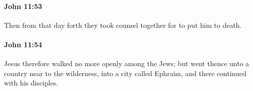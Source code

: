 		\paragraph{John 11:53} %
			\label{JOHN-11-53}

			Then from that day forth they took counsel together for to put him to death.

			\begin{framed}
				\scriptsize
				\begin{compactdesc}
					\item[SBLG] 
				\end{compactdesc}
			\end{framed}

		\paragraph{John 11:54} %
			\label{JOHN-11-54}

			Jesus therefore walked no more openly among the Jews; but went thence unto a country near to the wilderness, into a city called Ephraim, and there continued with his disciples.

